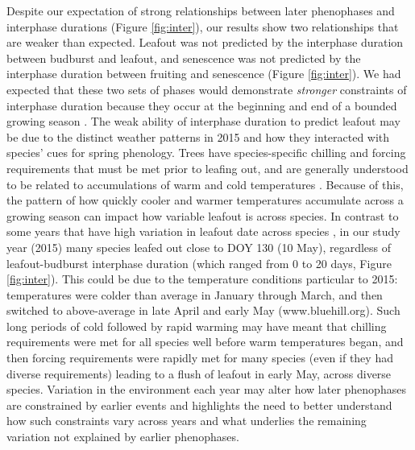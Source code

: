 \documentclass{article}
\begin{document}
\par Despite our expectation of strong relationships between later phenophases and interphase durations (Figure \ref{fig:inter}), our results show two relationships that are weaker than expected. Leafout was not predicted by the interphase duration between budburst and leafout, and senescence was not predicted by the interphase duration between fruiting and senescence (Figure \ref{fig:inter}). We had expected that these two sets of phases would demonstrate \textit{stronger} constraints of interphase duration because they occur at the beginning and end of a bounded growing season \citep{letten2013}. The weak ability of interphase duration to predict leafout may be due to the distinct weather patterns in 2015 and how they interacted with species' cues for spring phenology. Trees have species-specific chilling and forcing requirements that must be met prior to leafing out, and are generally understood to be related to accumulations of warm and cold temperatures \citep[e.g.,][]{schwartz2010,chuine2010,clark2014b}. Because of this, the pattern of how quickly cooler and warmer temperatures accumulate across a growing season can impact how variable leafout is across species. In contrast to some years that have high variation in leafout date across species \citep{lechowicz1995}, in our study year (2015) many species leafed out close to DOY 130 (10 May), regardless of leafout-budburst interphase duration (which ranged from 0 to 20 days, Figure \ref{fig:inter}). This could be due to the temperature conditions particular to 2015: temperatures were colder than average in January through March, and then switched to above-average in late April and early May (www.bluehill.org). Such long periods of cold followed by rapid warming may have meant that chilling requirements were met for all species well before warm temperatures began, and then forcing requirements were rapidly met for many species (even if they had diverse requirements) leading to a flush of leafout in early May, across diverse species. Variation in the environment each year may alter how later phenophases are constrained by earlier events and highlights the need to better understand how such constraints vary across years and what underlies the remaining variation not explained by earlier phenophases.
\end{document}
